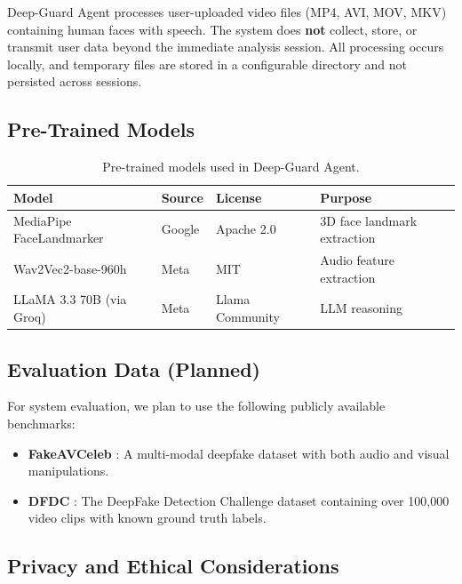 \documentclass[11pt,a4paper]{article}
\begin{document}
Deep-Guard Agent processes user-uploaded video files (MP4, AVI, MOV, MKV) containing human faces with speech. The system does \textbf{not} collect, store, or transmit user data beyond the immediate analysis session. All processing occurs locally, and temporary files are stored in a configurable directory and not persisted across sessions.

\subsection{Pre-Trained Models}

\begin{table}[H]
\centering
\caption{Pre-trained models used in Deep-Guard Agent.}
\label{tab:models}
\small
\begin{tabular}{@{}llll@{}}
\toprule
\textbf{Model} & \textbf{Source} & \textbf{License} & \textbf{Purpose} \\
\midrule
MediaPipe FaceLandmarker & Google     & Apache 2.0      & 3D face landmark extraction \\
Wav2Vec2-base-960h       & Meta       & MIT             & Audio feature extraction \\
LLaMA 3.3 70B (via Groq) & Meta      & Llama Community & LLM reasoning \\
\bottomrule
\end{tabular}
\end{table}

\subsection{Evaluation Data (Planned)}

For system evaluation, we plan to use the following publicly available benchmarks:

\begin{itemize}[leftmargin=2em]
    \item \textbf{FakeAVCeleb} \citep{khalid2021fakeavceleb}: A multi-modal deepfake dataset with both audio and visual manipulations.
    \item \textbf{DFDC} \citep{dolhansky2020deepfake}: The DeepFake Detection Challenge dataset containing over 100,000 video clips with known ground truth labels.
\end{itemize}

\subsection{Privacy and Ethical Considerations}
\end{document}
